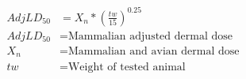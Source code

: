 \documentclass[fleqn, oneside, 11pt]{article}%
\begin{document}
\begin{preview}
\begin{align*}%
Adj LD_{50} & = X_{n} * \left(\frac{tw}{15}\right)^{0.25}\nonumber \\
Adj LD_{50} & =  \text{Mammalian adjusted dermal dose} \nonumber \\
X_{n} & =  \text{Mammalian and avian dermal dose} \nonumber \\
tw & =  \text{Weight of tested animal} \nonumber \\
\end{align*} 
\end{preview}
\end{document}
